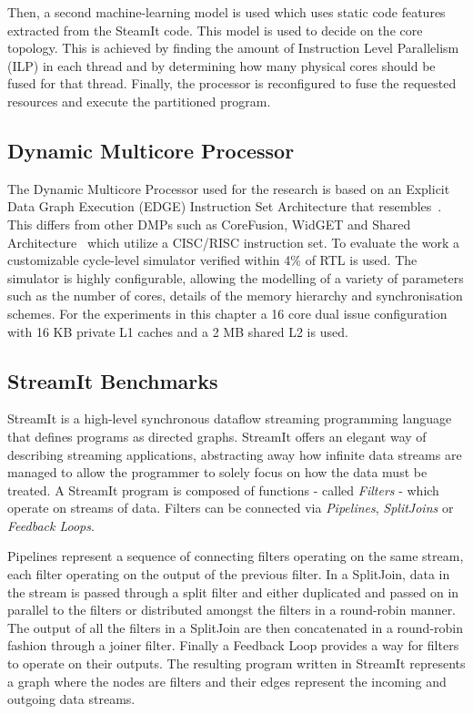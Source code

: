 Then, a second machine-learning model is used which uses static code features extracted from the SteamIt code.
This model is used to decide on the core topology.
This is achieved by finding the amount of Instruction Level Parallelism (ILP) in each thread and by determining how many physical cores should be fused for that thread.
Finally, the processor is reconfigured to fuse the requested resources and execute the partitioned program.


\subsection{Dynamic Multicore Processor}

The Dynamic Multicore Processor used for the research is based on an Explicit Data Graph Execution (EDGE) Instruction Set Architecture that resembles~\cite{sibi2014}.
This differs from other DMPs such as CoreFusion, WidGET and Shared Architecture~\cite{ipek2007CoreFusion,Watanabe2010Widget,zhou2014sharingarch} which utilize a CISC/RISC instruction set.
To evaluate the work a customizable cycle-level simulator verified within 4\% of RTL is used.
The simulator is highly configurable, allowing the modelling of a variety of parameters such as the number of cores, details of the memory hierarchy and synchronisation schemes.
For the experiments in this chapter a 16 core dual issue configuration with 16 KB private L1 caches and a 2 MB shared L2 is used.

\subsection{StreamIt Benchmarks}

StreamIt is a high-level synchronous dataflow streaming programming language that defines programs as directed graphs.
StreamIt offers an elegant way of describing streaming applications, abstracting away how infinite data streams are managed to allow the programmer to solely focus on how the data must be treated.
A StreamIt program is composed of functions - called \textit{Filters} - which operate on streams of data.
Filters can be connected via \textit{Pipelines}, \textit{SplitJoins} or \textit{Feedback Loops}.

Pipelines represent a sequence of connecting filters operating on the same stream, each filter operating on the output of the previous filter.
In a SplitJoin, data in the stream is passed through a split filter and either duplicated and passed on in parallel to the filters or distributed amongst the filters in a round-robin manner.
The output of all the filters in a SplitJoin are then concatenated in a round-robin fashion through a joiner filter.
Finally a Feedback Loop provides a way for filters to operate on their outputs.
The resulting program written in StreamIt represents a graph where the nodes are filters and their edges represent the incoming and outgoing data streams.

